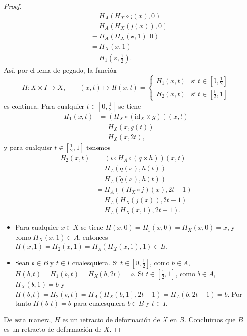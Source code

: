 \begin{proof}
\begin{align*}
&=H_A(H_X\circ j(x),0)\\
&=H_A(H_X(j(x)),0)\\
&=H_A(H_X(x,1),0)\\
&=H_X(x,1)\\
&=H_1(x,\tfrac12).
\end{align*}
Así, por el lema de pegado, la función
\[
H:X\times I\to X,\qquad (x,t)\mapsto H(x,t)=
\begin{cases}
H_1(x,t) & \text{si } t\in[0,\tfrac12]\\
H_2(x,t) & \text{si } t\in[\tfrac12,1]
\end{cases}
\]
es continua. Para cualquier $t\in[0,\tfrac12]$ se tiene
\begin{align*}
H_1(x,t)&=(H_X\circ(\mathrm{id}_X\times g))(x,t)\\
&=H_X(x,g(t))\\
&=H_X(x,2t),
\end{align*}
y para cualquier $t\in[\tfrac12,1]$ tenemos
\begin{align*}
H_2(x,t)&=(\iota\circ H_A\circ(q\times h))(x,t)\\
&=H_A(q(x),h(t))\\
&=H_A(\widetilde{q}(x),h(t))\\
&=H_A((H_X\circ j)(x),2t-1)\\
&=H_A(H_X(j(x)),2t-1)\\
&=H_A(H_X(x,1),2t-1).
\end{align*}
\begin{itemize}
\item Para cualquier $x\in X$ se tiene $H(x,0)=H_1(x,0)=H_X(x,0)=x$, y como $H_X(x,1)\in A$, entonces $H(x,1)=H_2(x,1)=H_A(H_X(x,1),1)\in B$.
\item Sean $b\in B$ y $t\in I$ cualesquiera. Si $t\in[0,\tfrac12]$, como $b\in A$, $H(b,t)=H_1(b,t)=H_X(b,2t)=b$. Si $t\in[\tfrac12,1]$, como $b\in A$, $H_X(b,1)=b$ y $H(b,t)=H_2(b,t)=H_A(H_X(b,1),2t-1)=H_A(b,2t-1)=b$. Por tanto $H(b,t)=b$ para cualesquiera $b\in B$ y $t\in I$.
\end{itemize}
De esta manera, $H$ es un retracto de deformación de $X$ en $B$. Concluimos que $B$ es un retracto de deformación de $X$.
\end{proof}\clearpage
